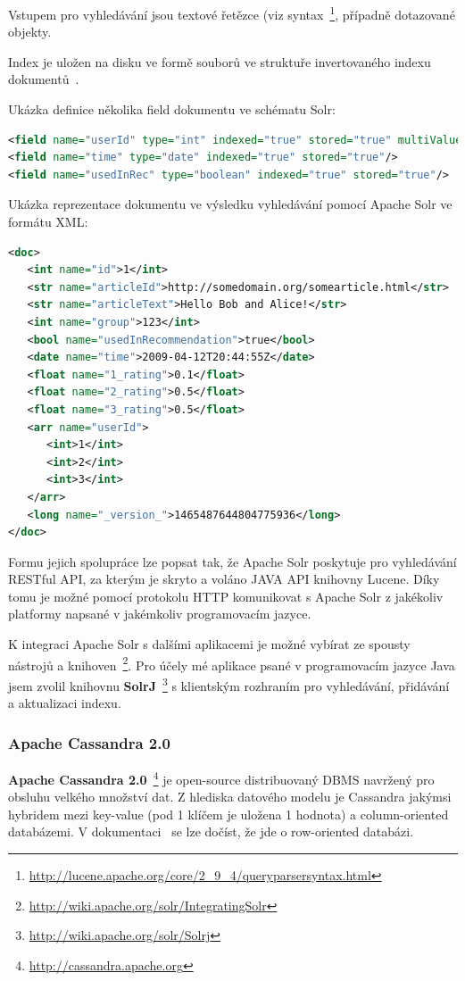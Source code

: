 \documentclass[thesis=M,czech]{FITthesis}[2014/05/07]
\begin{document}
Vstupem pro vyhledávání jsou textové řetězce (viz syntax~\footnote{\url{http://lucene.apache.org/core/2_9_4/queryparsersyntax.html}}, případně dotazované objekty.

Index je uložen na disku ve formě souborů ve struktuře invertovaného indexu dokumentů~\cite{wiki:invindex}.

Ukázka definice několika field dokumentu ve schématu Solr:

\begin{lstlisting}[language=xml]
<field name="userId" type="int" indexed="true" stored="true" multiValued="true"/>	
<field name="time" type="date" indexed="true" stored="true"/>
<field name="usedInRec" type="boolean" indexed="true" stored="true"/>
\end{lstlisting}

Ukázka reprezentace dokumentu ve výsledku vyhledávání pomocí Apache Solr ve formátu XML:

\begin{lstlisting}[language=xml]
<doc>
   <int name="id">1</int>
   <str name="articleId">http://somedomain.org/somearticle.html</str>
   <str name="articleText">Hello Bob and Alice!</str>
   <int name="group">123</int>
   <bool name="usedInRecommendation">true</bool>
   <date name="time">2009-04-12T20:44:55Z</date>
   <float name="1_rating">0.1</float>
   <float name="2_rating">0.5</float>
   <float name="3_rating">0.5</float>      
   <arr name="userId">
      <int>1</int>
      <int>2</int>
      <int>3</int>
   </arr>
   <long name="_version_">1465487644804775936</long>      
</doc>
\end{lstlisting}

Formu jejich spolupráce lze popsat tak, že Apache Solr poskytuje pro vyhledávání RESTful API, za kterým je skryto a voláno JAVA API knihovny Lucene. Díky tomu je možné pomocí protokolu HTTP komunikovat s Apache Solr z jakékoliv platformy napsané v jakémkoliv programovacím jazyce. 

K integraci Apache Solr s dalšími aplikacemi je možné vybírat ze spousty nástrojů a knihoven~\footnote{\url{http://wiki.apache.org/solr/IntegratingSolr}}. Pro účely mé aplikace psané v programovacím jazyce Java jsem zvolil knihovnu \textbf{SolrJ}~\footnote{\url{http://wiki.apache.org/solr/Solrj}} s klientským rozhraním pro vyhledávání, přidávání a aktualizaci indexu. 

\subsubsection{Apache Cassandra 2.0}
\textbf{Apache Cassandra 2.0}~\footnote{\url{http://cassandra.apache.org}} je open-source distribuovaný DBMS navržený pro obsluhu velkého množství dat. Z hlediska datového modelu je Cassandra jakýmsi hybridem mezi key-value (pod 1 klíčem je uložena 1 hodnota) a column-oriented databázemi. V dokumentaci~\cite{cassdoc} se lze dočíst, že jde o row-oriented databázi.
\end{document}
